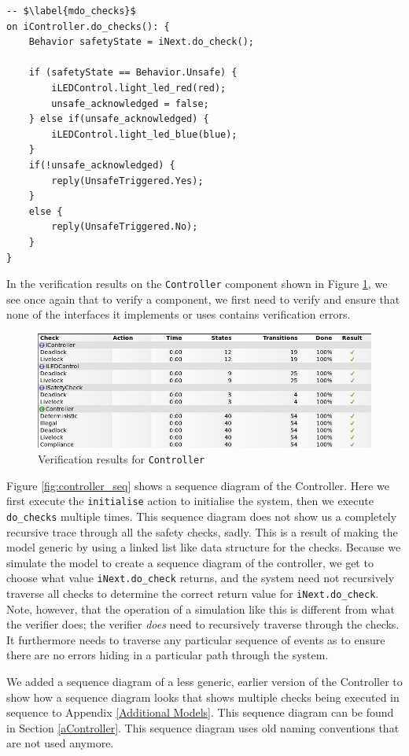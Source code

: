 \documentclass[12pt]{scrreprt}
\begin{document}
\begin{verbatim}
-- $\label{mdo_checks}$
on iController.do_checks(): {
	Behavior safetyState = iNext.do_check();
	
	if (safetyState == Behavior.Unsafe) {
		iLEDControl.light_led_red(red);
		unsafe_acknowledged = false;
	} else if(unsafe_acknowledged) {
		iLEDControl.light_led_blue(blue);
	}
	if(!unsafe_acknowledged) {
		reply(UnsafeTriggered.Yes);
	}
	else {
		reply(UnsafeTriggered.No);
	}
}

 \end{verbatim} 
 
In the verification results on the \texttt{Controller} component shown in Figure \ref{fig:controll_verif}, we see once again that to verify a component, we first need to verify and ensure that none of the interfaces it implements or uses contains verification errors.
 
\begin{figure}[H]
    \centering
    \includegraphics[width=\textwidth]{Figures/results/modelling_figures/Controller/Controller_verification.png}
    \caption{Verification results for \texttt{Controller}}
    \label{fig:controll_verif}
\end{figure}

Figure \ref{fig:controller_seq} shows a sequence diagram of the Controller. Here we first execute the \texttt{initialise} action to initialise the system, then we execute \texttt{do\_checks} multiple times. This sequence diagram does not show us a completely recursive trace through all the safety checks, sadly. This is a result of making the model generic by using a linked list like data structure for the checks. Because we simulate the model to create a sequence diagram of the controller, we get to choose what value \texttt{iNext.do\_check} returns, and the system need not recursively traverse all checks to determine the correct return value for \texttt{iNext.do\_check}. Note, however, that the operation of a simulation like this is different from what the verifier does; the verifier \textit{does} need to recursively traverse through the checks. It furthermore needs to traverse any particular sequence of events as to ensure there are no errors hiding in a particular path through the system.
\par
We added a sequence diagram of a less generic, earlier version of the Controller to show how a sequence diagram looks that shows multiple checks being executed in sequence to Appendix \ref{Additional Models}. This sequence diagram can be found in Section \ref{aController}. This sequence diagram uses old naming conventions that are not used anymore.
\end{document}
